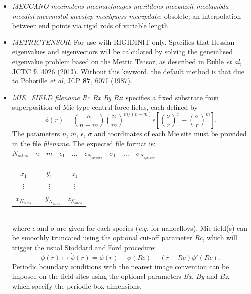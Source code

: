 \documentclass[12pt,a4paper,dvips]{article}
\begin{document}
\begin{itemize}
\item {\it MECCANO mecimdens mecmaximages mecitdens mecmaxit meclambda mecdist mecrmstol 
mecstep mecdguess mecupdate\/}: obsolete; an interpolation between 
end points via rigid rods of variable length.

\item {\it METRICTENSOR\/}: For use with RIGIDINIT only. Specifies that Hessian eigenvalues and eigenvectors will be calculated by solving the generalised eigenvalue problem based on the Metric Tensor, as described in R\"{u}hle {\it et al}, JCTC {\bf 9}, 4026 (2013). Without this keyword, the default method is that due to Pohorille {\it et al}, JCP {\bf 87}, 6070 (1987).

\item {\it MIE\_FIELD filename Rc Bx By Bz\/}: specifies a fixed substrate from superposition of Mie-type central force fields, each defined by
\begin{displaymath}
\phi(r) = \left(\frac{n}{n-m}\right) \left(\frac{n}{m}\right)^{m/(n-m)} \epsilon \left[ \left(\frac{\sigma}{r}\right)^{n} - \left(\frac{\sigma}{r}\right)^{m}\right].
\end{displaymath}
The parameters $n$, $m$, $\epsilon$, $\sigma$ and coordinates of each Mie site must be provided in the file {\it filename}. The expected file format is: \\
$ N_{sites} \quad n \quad m \quad \epsilon_{1} \quad \dots \quad \epsilon_{N_{species}} \quad \sigma_{1} \quad \dots \quad \sigma_{N_{species}}$ \\ 
\begin{tabular}{ccc}
$x_{1}$ & $y_{1}$ & $z_{1}$ \\
$\vdots$ & $\vdots$ & $\vdots$ \\
$x_{N_{sites}}$ & $\quad y_{N_{sites}}$ & $z_{N_{sites}}$
\end{tabular} \\
where $\epsilon$ and $\sigma$ are given for each species (\emph{e.g.} for nanoalloys). Mie field(s) can be smoothly truncated using the optional cut-off parameter \emph{Rc}, which will trigger the usual Stoddard and Ford procedure:
\begin{displaymath}
\phi(r) \mapsto \tilde{\phi}(r) = \phi(r) - \phi(Rc) - (r-Rc)\phi'(Rc).
\end{displaymath}
Periodic boundary conditions with the nearest image convention can be imposed on the field sites using the optional parameters \emph{Bx}, \emph{By} and \emph{Bz}, which specify the periodic box dimensions.


\end{itemize}
\end{document}
